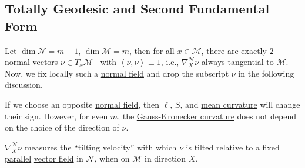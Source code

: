 \subsection{Totally Geodesic and Second Fundamental Form}
Let \(\dim \mathcal{N} = m+1\), \(\dim \mathcal{M} = m\), then for all \(x\in \mathcal{M} \), there are exactly \(2\) normal vectors \(\nu \in T_x \mathcal{M} ^{\perp} \) with \(\left\langle \nu, \nu \right\rangle \equiv 1\), i.e., \(\nabla _X^{\mathcal{N} } \nu \) always tangential to \(\mathcal{M} \). Now, we fix locally such a \hyperref[not:normal-bundle]{normal field} and drop the subscript \(\nu \) in the following discussion.

\begin{note}
	If we choose an opposite \hyperref[not:normal-bundle]{normal field}, then \(\ell \), \(S\), and \hyperref[def:mean-curvature]{mean curvature} will change their sign. However, for even \(m\), the \hyperref[def:Gauss-Kronecker-curvature]{Gauss-Kronecker curvature} does not depend on the choice of the direction of \(\nu \).
\end{note}

\begin{intuition}
	\(\nabla _X^{\mathcal{N} } \nu \) measures the ``tilting velocity'' with which \(\nu \) is tilted relative to a fixed \hyperref[def:parallel]{parallel} \hyperref[def:vector-field]{vector field} in \(\mathcal{N} \), when on \(\mathcal{M} \) in direction \(X\).
\end{intuition}

